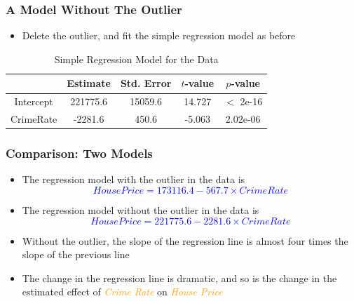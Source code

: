 \documentclass[compress]{beamer}
\begin{document}
\begin{frame}
\frametitle{\sc A Model Without The Outlier}
	\begin{itemize}
		\item Delete the outlier, and fit the simple regression model as before
	\end{itemize}
    \begin{table}[hptb]
	\scriptsize
	\caption{\small Simple Regression Model for the Data}
	\begin{center}
		\begin{tabular}{ c c c c c} 
			\toprule
			& Estimate & Std. Error & $t$-value & $p$-value \\
			\midrule
			Intercept & 221775.6  & 15059.6  & 14.727 & $<$ 2e-16 \\
            CrimeRate & -2281.6   &   450.6  & -5.063 & 2.02e-06 \\
			\bottomrule
		\end{tabular}
		\end{center}
\end{table}
\end{frame}


\begin{frame}
\frametitle{\sc Comparison: Two Models}
	\begin{itemize}
		\item The regression model with the outlier in the data is
		\textcolor{blue}{\[
		House Price = 173116.4 - 567.7 \times Crime Rate
		\]}
		\item The regression model without the outlier in the data is
		\textcolor{blue}{\[
		House Price = 221775.6 - 2281.6 \times Crime Rate
		\]}
		\item Without the outlier, the slope of the regression line is almost four times the slope of the previous line
		\item The change in the regression line is dramatic, and so is the change in the estimated effect of \textcolor{orange}{\textit{Crime Rate}} on \textcolor{orange}{\textit{House Price}}
	\end{itemize}
\end{frame}
\end{document}
